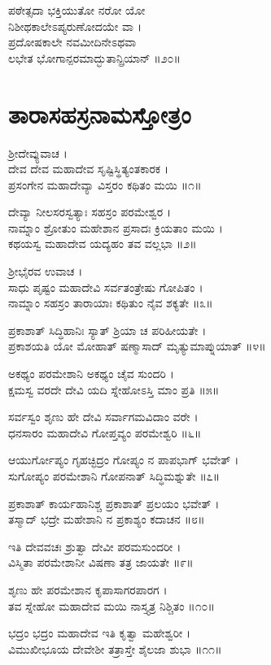 ಪಠೇತ್ಸದಾ ಭಕ್ತಿಯುತೋ ನರೋ ಯೋ\\ ನಿಶೀಥಕಾಲೇಽಪ್ಯರುಣೋದಯೇ ವಾ ।\\
ಪ್ರದೋಷಕಾಲೇ ನವಮೀದಿನೇಽಥವಾ\\ ಲಭೇತ ಭೋಗಾನ್ಪರಮಾದ್ಭುತಾನ್ಪ್ರಿಯಾನ್ ॥೨೦॥

\section{ತಾರಾಸಹಸ್ರನಾಮಸ್ತೋತ್ರಂ}


ಶ್ರೀದೇವ್ಯುವಾಚ ।\\
ದೇವ ದೇವ ಮಹಾದೇವ ಸೃಷ್ಟಿಸ್ಥಿತ್ಯಂತಕಾರಕ ।\\
ಪ್ರಸಂಗೇನ ಮಹಾದೇವ್ಯಾ ವಿಸ್ತರಂ ಕಥಿತಂ ಮಯಿ ॥೧॥

ದೇವ್ಯಾ ನೀಲಸರಸ್ವತ್ಯಾಃ ಸಹಸ್ರಂ ಪರಮೇಶ್ವರ ।\\
ನಾಮ್ನಾಂ ಶ್ರೋತುಂ ಮಹೇಶಾನ ಪ್ರಸಾದಃ ಕ್ರಿಯತಾಂ ಮಯಿ ।\\
ಕಥಯಸ್ವ ಮಹಾದೇವ ಯದ್ಯಹಂ ತವ ವಲ್ಲಭಾ ॥೨॥

ಶ್ರೀಭೈರವ ಉವಾಚ ।\\
ಸಾಧು ಪೃಷ್ಟಂ ಮಹಾದೇವಿ ಸರ್ವತಂತ್ರೇಷು ಗೋಪಿತಂ ।\\
ನಾಮ್ನಾಂ ಸಹಸ್ರಂ ತಾರಾಯಾಃ ಕಥಿತುಂ ನೈವ ಶಕ್ಯತೇ ॥೩॥

ಪ್ರಕಾಶಾತ್ ಸಿದ್ಧಿಹಾನಿಃ ಸ್ಯಾತ್ ಶ್ರಿಯಾ ಚ ಪರಿಹೀಯತೇ ।\\
ಪ್ರಕಾಶಯತಿ ಯೋ ಮೋಹಾತ್ ಷಣ್ಮಾಸಾದ್ ಮೃತ್ಯುಮಾಪ್ನುಯಾತ್ ॥೪॥

ಅಕಥ್ಯಂ ಪರಮೇಶಾನಿ ಅಕಥ್ಯಂ ಚೈವ ಸುಂದರಿ ।\\
ಕ್ಷಮಸ್ವ ವರದೇ ದೇವಿ ಯದಿ ಸ್ನೇಹೋಽಸ್ತಿ ಮಾಂ ಪ್ರತಿ ॥೫॥

ಸರ್ವಸ್ವಂ ಶೃಣು ಹೇ ದೇವಿ ಸರ್ವಾಗಮವಿದಾಂ ವರೇ ।\\
ಧನಸಾರಂ ಮಹಾದೇವಿ ಗೋಪ್ತವ್ಯಂ ಪರಮೇಶ್ವರಿ ॥೬॥

ಆಯುರ್ಗೋಪ್ಯಂ ಗೃಹಚ್ಛಿದ್ರಂ ಗೋಪ್ಯಂ ನ ಪಾಪಭಾಗ್ ಭವೇತ್ ।\\
ಸುಗೋಪ್ಯಂ ಪರಮೇಶಾನಿ ಗೋಪನಾತ್ ಸಿದ್ಧಿಮಶ್ನುತೇ ॥೭॥

ಪ್ರಕಾಶಾತ್ ಕಾರ್ಯಹಾನಿಶ್ಚ ಪ್ರಕಾಶಾತ್ ಪ್ರಲಯಂ ಭವೇತ್ ।\\
ತಸ್ಮಾದ್ ಭದ್ರೇ ಮಹೇಶಾನಿ ನ ಪ್ರಕಾಶ್ಯಂ ಕದಾಚನ ॥೮॥

ಇತಿ ದೇವವಚಃ ಶ್ರುತ್ವಾ ದೇವೀ ಪರಮಸುಂದರೀ ।\\
ವಿಸ್ಮಿತಾ ಪರಮೇಶಾನೀ ವಿಷಣಾ ತತ್ರ ಜಾಯತೇ ॥೯॥

ಶೃಣು ಹೇ ಪರಮೇಶಾನ ಕೃಪಾಸಾಗರಪಾರಗ ।\\
ತವ ಸ್ನೇಹೋ ಮಹಾದೇವ ಮಯಿ ನಾಸ್ತ್ಯತ್ರ ನಿಶ್ಚಿತಂ ॥೧೦॥

ಭದ್ರಂ ಭದ್ರಂ ಮಹಾದೇವ ಇತಿ ಕೃತ್ವಾ ಮಹೇಶ್ವರೀ ।\\
ವಿಮುಖೀಭೂಯ ದೇವೇಶೀ ತತ್ರಾಸ್ತೇ ಶೈಲಜಾ ಶುಭಾ ॥೧೧॥

